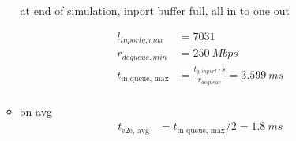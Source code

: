 \documentclass[]{scrartcl}
\begin{document}
\begin{itemize}
\begin{itemize}
                    at end of simulation, inport buffer full, all in to one out

                    \begin{align}
                        l_{inport q, max} &= 7031\\
                        r_{dequeue, min} &= \SI{250}{Mbps}\\
                        t_\text{in queue, max} &= \frac{t_{q,inport}\cdot s}{r_{dequeue}} = \SI{3.599}{ms}\\
                    \end{align}

                \item on avg
                    \begin{align}
                        t_\text{e2e, avg} &= t_\text{in queue, max} / 2 = \SI{1.8}{ms}
                    \end{align}


\end{itemize}
\end{itemize}
\end{document}
